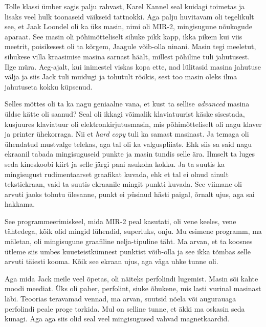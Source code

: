 Tolle klassi ümber sagis palju rahvast, Karel Kannel 
seal kuidagi toimetas ja lisaks veel hulk toonaseid väikseid tattnokki. Aga 
palju huvitavam oli tegelikult see, et Jaak Loondel 
oli ka üks masin, nimi oli 
MIR-2, mingisugune nõukogude aparaat. See masin oli põhimõtteliselt sihuke 
pikk kapp, ikka pikem kui viis meetrit, poisikesest oli ta kõrgem, Jaagule 
võib-olla ninani. Masin tegi meeletut, sihukese villa kraasimise masina sarnast 
häält, millest põhiline tuli jahutusest. Ilge müra. Aeg-ajalt, kui inimestel 
viskas  kopa ette,  nad lülitasid masina jahutuse välja ja siis 
Jack tuli muidugi ja 
tohutult röökis, sest too masin oleks ilma jahutuseta kokku küpsenud. 

Selles mõttes oli ta ka nagu geniaalne vana, et kust ta sellise \emph{advanced} 
masina üldse kätte oli saanud? Seal oli ikkagi võimalik klaviatuurist käske 
sisestada, kusjuures klaviatuur oli elektronkirjutusmasin, mis  põhimõtteliselt 
oli nagu klaver ja printer ühekorraga. Nii et \emph{hard copy} tuli ka samast 
masinast. Ja temaga oli ühendatud mustvalge telekas, aga tal oli ka 
valguspliiats. Ehk siis sa said nagu ekraanil tabada mingisuguseid punkte ja  
masin tundis selle ära. Ilmselt ta luges seda  kineskoobi kiirt ja selle järgi 
pani asukoha kokku. Ja ta suutis ka mingisugust rudimentaarset graafikat 
kuvada, ehk et tal ei olnud ainult tekstiekraan, vaid ta suutis ekraanile  
mingit punkti kuvada. See viimane oli arvuti jaoks tohutu ülesanne, punkt ei 
püsinud hästi paigal, õrnalt ujus, aga sai hakkama. 

See programmeerimiskeel, mida MIR-2 peal kasutati, oli vene keeles, vene 
tähtedega, kõik olid mingid lühendid, superluks, onju. Mu esimene programm, ma 
mäletan, oli mingisugune graafiline nelja-tipuline täht. Ma arvan, et ta 
koosnes ütleme siis  umbes kuueteistkümnest punktist võib-olla ja see ikka 
tõmbas selle arvuti täiesti kooma. Kõik see ekraan ujus, aga väga uhke tunne 
oli. 

Aga mida Jack meile veel õpetas, oli näiteks 
perfolindi lugemist. Masin sõi kahte moodi meediat. Üks oli paber, perfolint, 
siuke õhukene, mis lasti vurinal masinast läbi. Teoorias teravamad vennad, ma 
arvan, suutsid nõela või augurauaga  perfolindi peale proge torkida. Mul on 
selline tunne, et äkki ma oskasin seda kunagi. Aga aga siis olid seal veel 
mingisugused vahvad magnetkaardid. 

